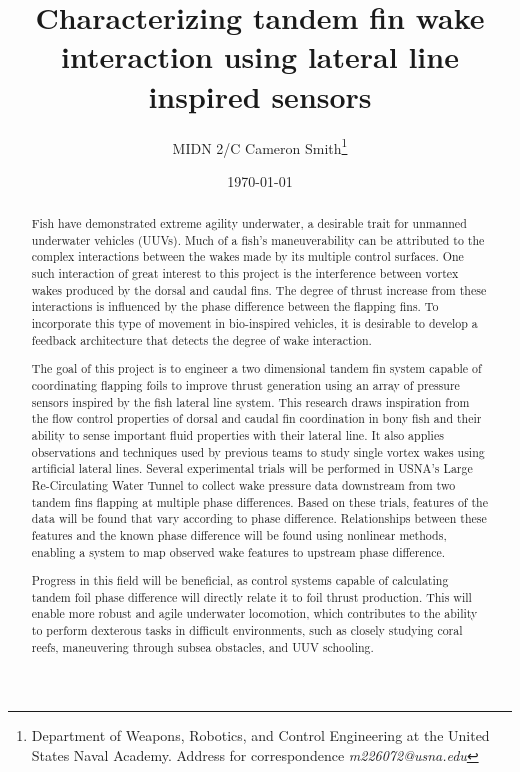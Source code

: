 \documentclass[10pt]{article}
\title{Characterizing tandem fin wake interaction using lateral line inspired sensors}
\author{MIDN 2/C Cameron Smith\thanks{Department of Weapons, Robotics, and Control Engineering at the United States Naval Academy. Address for correspondence \emph{m226072@usna.edu}}}
\date{\today}
\begin{document}
\maketitle
\begin{abstract}

    Fish have demonstrated extreme agility underwater, a desirable trait for unmanned underwater vehicles (UUVs). Much of a fish's maneuverability can be attributed to the complex interactions between the wakes made by its multiple control surfaces. One such interaction of great interest to this project is the interference between vortex wakes produced by the dorsal and caudal fins. The degree of thrust increase from these interactions is influenced by the phase difference between the flapping fins. To incorporate this type of movement in bio-inspired vehicles, it is desirable to develop a feedback architecture that detects the degree of wake interaction.
    
    The goal of this project is to engineer a two dimensional tandem fin system capable of coordinating flapping foils to improve thrust generation using an array of pressure sensors inspired by the fish lateral line system. This research draws inspiration from the flow control properties of dorsal and caudal fin coordination in bony fish and their ability to sense important fluid properties with their lateral line. It also applies observations and techniques used by previous teams to study single vortex wakes using artificial lateral lines. Several experimental trials will be performed in USNA's Large Re-Circulating Water Tunnel to collect wake pressure data downstream from two tandem fins flapping at multiple phase differences. Based on these trials, features of the data will be found that vary according to phase difference. Relationships between these features and the known phase difference will be found using nonlinear methods, enabling a system to map observed wake features to upstream phase difference.
    
    Progress in this field will be beneficial, as control systems capable of calculating tandem foil phase difference will directly relate it to foil thrust production. This will enable more robust and agile underwater locomotion, which contributes to the ability to perform dexterous tasks in difficult environments, such as closely studying coral reefs, maneuvering through subsea obstacles, and UUV schooling.
    
\end{abstract}
\end{document}
